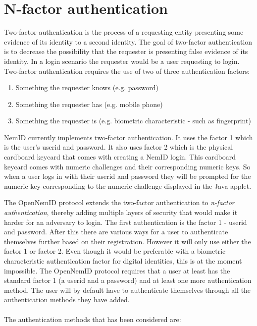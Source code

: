 \documentclass[twosided]{report}
\begin{document}
\section{N-factor authentication}
\label{sect:nfactauth}
Two-factor authentication is the process of a requesting entity presenting some evidence of its identity to a second identity. The goal of two-factor authentication is to decrease the possibility that the requester is presenting false evidence of its identity. In a login scenario the requester would be a user requesting to login. Two-factor authentication requires the use of two of three authentication factors:
\begin{enumerate}
\item Something the requester knows (e.g. password)
\item Something the requester has (e.g. mobile phone)
\item Something the requester is (e.g. biometric characteristic - such as fingerprint)
\end{enumerate}
\par
NemID currently implements two-factor authentication. It uses the factor 1 which is the user's userid and password. It also uses factor 2 which is the physical cardboard keycard that comes with creating a NemID login. This cardboard keycard comes with numeric challenges and their corresponding numeric keys. So when a user logs in with their userid and password they will be prompted for the numeric key corresponding to the numeric challenge displayed in the Java applet.
\par
The OpenNemID protocol extends the two-factor authentication to \emph{n-factor authentication}, thereby adding multiple layers of security that would make it harder for an adversary to login. The first authentication is the factor 1 - userid and password. After this there are various ways for a user to authenticate themselves further based on their registration. However it will only use either the factor 1 or factor 2. Even though it would be preferable with a biometric characteristic authentication factor for digital identities, this is at the moment impossible. The OpenNemID protocol requires that a user at least has the standard factor 1 (a userid and a password) and at least one more authentication method. The user will by default have to authenticate themselves through all the authentication methods they have added.
\\
\\
The authentication methods that has been considered are:
\end{document}
